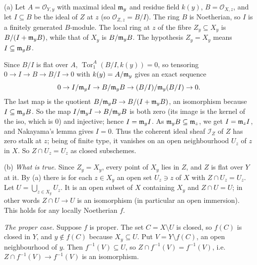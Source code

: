 \documentclass[11pt]{article}
\begin{document}
\pf
(a) Let $A=\mathcal O_{Y,y}$ with maximal ideal $\mathfrak m_y$ and residue field $k(y)$, $B=\mathcal O_{X,z}$, and let $I\subseteq B$ be the ideal of $Z$ at $z$ (so $\mathcal O_{Z,z}=B/I$). The ring $B$ is Noetherian, so $I$ is a finitely generated $B$-module. The local ring at $z$ of the fibre $Z_y\subseteq X_y$ is $B/(I+\mathfrak m_yB)$, while that of $X_y$ is $B/\mathfrak m_yB$. The hypothesis $Z_y=X_y$ means $I\subseteq\mathfrak m_yB$.

Since $B/I$ is flat over $A$, $\operatorname{Tor}_1^A(B/I,k(y))=0$, so tensoring $0\to I\to B\to B/I\to0$ with $k(y)=A/\mathfrak m_y$ gives an exact sequence
\[ 0\to I/\mathfrak m_yI\to B/\mathfrak m_yB\to (B/I)/\mathfrak m_y(B/I)\to0 . \]
The last map is the quotient $B/\mathfrak m_yB\to B/(I+\mathfrak m_yB)$, an isomorphism because $I\subseteq\mathfrak m_yB$. So the map $I/\mathfrak m_yI\to B/\mathfrak m_yB$ is both zero (its image is the kernel of the iso, which is $0$) and injective; hence $I=\mathfrak m_yI$. As $\mathfrak m_yB\subseteq\mathfrak m_z$, we get $I=\mathfrak m_zI$, and Nakayama's lemma gives $I=0$. Thus the coherent ideal sheaf $\mathcal I_Z$ of $Z$ has zero stalk at $z$; being of finite type, it vanishes on an open neighbourhood $U_z$ of $z$ in $X$. So $Z\cap U_z=U_z$ as closed subschemes.

(b) \emph{What is true.} Since $Z_y=X_y$, every point of $X_y$ lies in $Z$, and $Z$ is flat over $Y$ at it. By (a) there is for each $z\in X_y$ an open set $U_z\ni z$ of $X$ with $Z\cap U_z=U_z$. Let $U=\bigcup_{z\in X_y}U_z$. It is an open subset of $X$ containing $X_y$ and $Z\cap U=U$; in other words $Z\cap U\to U$ is an isomorphism (in particular an open immersion). This holds for any locally Noetherian $f$.

\emph{The proper case.} Suppose $f$ is proper. The set $C=X\setminus U$ is closed, so $f(C)$ is closed in $Y$, and $y\notin f(C)$ because $X_y\subseteq U$. Put $V=Y\setminus f(C)$, an open neighbourhood of $y$. Then $f^{-1}(V)\subseteq U$, so $Z\cap f^{-1}(V)=f^{-1}(V)$, i.e.\ $Z\cap f^{-1}(V)\to f^{-1}(V)$ is an isomorphism.
\end{document}
